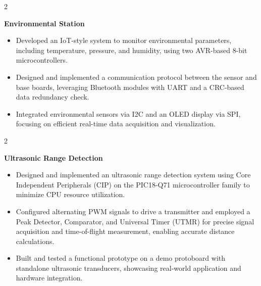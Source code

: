 \documentclass[10pt, a4paper]{article}
\newenvironment{highlights}{
    \begin{itemize}[
        topsep=0.1 cm,
        parsep=0.1 cm,
        partopsep=0pt,
        itemsep=0pt,
        leftmargin=0 cm + 10pt
    ]
}{
    \end{itemize}
} %
\newenvironment{twocolentry}[2][]{
    \onecolentry
    \def\secondColumn{#2}
    \setcolumnwidth{\fill, 3.5 cm}
    \begin{paracol}{2}
}{
    \switchcolumn \raggedleft \secondColumn
    \end{paracol}
    \endonecolentry
} %
\let\hrefWithoutArrow\href
\renewcommand{\href}[2]{\hrefWithoutArrow{#1}{\ifthenelse{\equal{#2}{}}{ }{#2 }\raisebox{.15ex}{\footnotesize \faExternalLink*}}}
\begin{document}
        \vspace{0.2 cm}

        \begin{twocolentry}{
            \href{https://github.com/cristiancristea00/environmental-station}{GitHub}
        }
            \textbf{Environmental Station}
            \begin{highlights}
                \item Developed an IoT-style system to monitor environmental parameters, including temperature, pressure, and humidity, using two AVR-based 8-bit microcontrollers.
                \item Designed and implemented a communication protocol between the sensor and base boards, leveraging Bluetooth modules with UART and a CRC-based data redundancy check.
                \item Integrated environmental sensors via I2C and an OLED display via SPI, focusing on efficient real-time data acquisition and visualization.
            \end{highlights}
        \end{twocolentry}


        \vspace{0.2 cm}

        \begin{twocolentry}{
            \href{https://github.com/microchip-pic-avr-examples/pic18f56q71-ultrasonic-range-detection-mplab-mcc}{GitHub}
        }
            \textbf{Ultrasonic Range Detection}
            \begin{highlights}
                \item Designed and implemented an ultrasonic range detection system using Core Independent Peripherals (CIP) on the PIC18-Q71 microcontroller family to minimize CPU resource utilization.
                \item Configured alternating PWM signals to drive a transmitter and employed a Peak Detector, Comparator, and Universal Timer (UTMR) for precise signal acquisition and time-of-flight measurement, enabling accurate distance calculations.
                \item Built and tested a functional prototype on a demo protoboard with standalone ultrasonic transducers, showcasing real-world application and hardware integration.
            \end{highlights}
        \end{twocolentry}


        \vspace{0.2 cm}
\end{document}
